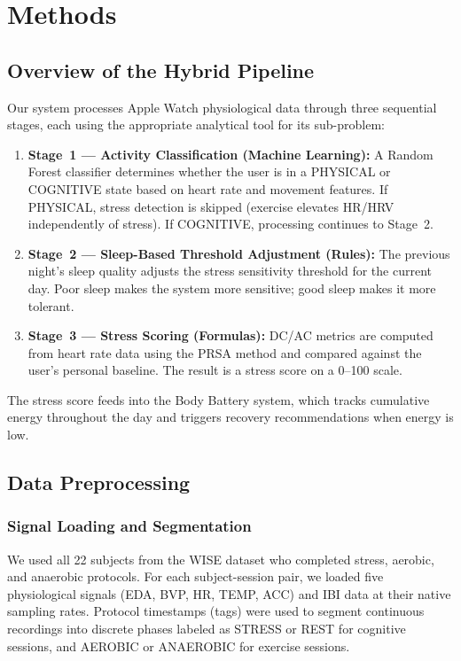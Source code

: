 \documentclass[12pt,letterpaper]{article}
\begin{document}
\section{Methods}

\subsection{Overview of the Hybrid Pipeline}

Our system processes Apple Watch physiological data through three sequential stages, each using the appropriate analytical tool for its sub-problem:

\begin{enumerate}
    \item \textbf{Stage~1 --- Activity Classification (Machine Learning):} A Random Forest classifier determines whether the user is in a PHYSICAL or COGNITIVE state based on heart rate and movement features. If PHYSICAL, stress detection is skipped (exercise elevates HR/HRV independently of stress). If COGNITIVE, processing continues to Stage~2.
    \item \textbf{Stage~2 --- Sleep-Based Threshold Adjustment (Rules):} The previous night's sleep quality adjusts the stress sensitivity threshold for the current day. Poor sleep makes the system more sensitive; good sleep makes it more tolerant.
    \item \textbf{Stage~3 --- Stress Scoring (Formulas):} DC/AC metrics are computed from heart rate data using the PRSA method and compared against the user's personal baseline. The result is a stress score on a 0--100 scale.
\end{enumerate}

The stress score feeds into the Body Battery system, which tracks cumulative energy throughout the day and triggers recovery recommendations when energy is low.

\subsection{Data Preprocessing}

\subsubsection{Signal Loading and Segmentation}

We used all 22 subjects from the WISE dataset who completed stress, aerobic, and anaerobic protocols. For each subject-session pair, we loaded five physiological signals (EDA, BVP, HR, TEMP, ACC) and IBI data at their native sampling rates. Protocol timestamps (tags) were used to segment continuous recordings into discrete phases labeled as STRESS or REST for cognitive sessions, and AEROBIC or ANAEROBIC for exercise sessions.
\end{document}
